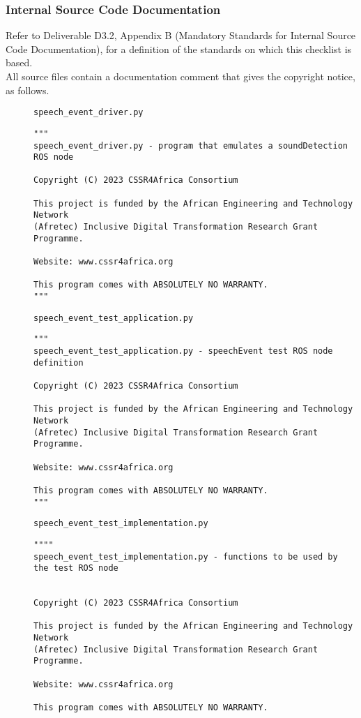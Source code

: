 \documentclass{CSSRforAfrica}
\newcommand{\checkboxChecked}{\fbox{\ding{51}}} %
\begin{document}
 
\subsubsection{Internal Source Code Documentation}
\label{subsubsection:speech_event_test_documentation_standards}  
 
Refer to Deliverable D3.2, Appendix B (Mandatory Standards for Internal Source Code Documentation), for a definition of the standards on which this checklist is based.\\

\noindent All source files contain a documentation comment that gives the copyright notice, as follows.
 
\begin{description}

\item[\checkboxChecked] {\small \verb+speech_event_driver.py+}  
{\small \begin{verbatim}
"""
speech_event_driver.py - program that emulates a soundDetection ROS node

Copyright (C) 2023 CSSR4Africa Consortium

This project is funded by the African Engineering and Technology Network 
(Afretec) Inclusive Digital Transformation Research Grant Programme.

Website: www.cssr4africa.org

This program comes with ABSOLUTELY NO WARRANTY.
"""

\end{verbatim} }

\item[\checkboxChecked] {\small \verb+speech_event_test_application.py+}  
{\small \begin{verbatim}
"""
speech_event_test_application.py - speechEvent test ROS node definition

Copyright (C) 2023 CSSR4Africa Consortium

This project is funded by the African Engineering and Technology Network 
(Afretec) Inclusive Digital Transformation Research Grant Programme.

Website: www.cssr4africa.org

This program comes with ABSOLUTELY NO WARRANTY.
"""

\end{verbatim} }

\item[\checkboxChecked]  {\small \verb+speech_event_test_implementation.py+} 
{\small \begin{verbatim}
""""
speech_event_test_implementation.py - functions to be used by the test ROS node


Copyright (C) 2023 CSSR4Africa Consortium

This project is funded by the African Engineering and Technology Network 
(Afretec) Inclusive Digital Transformation Research Grant Programme.

Website: www.cssr4africa.org

This program comes with ABSOLUTELY NO WARRANTY.
\end{verbatim} }


\end{description} 
\end{document}
